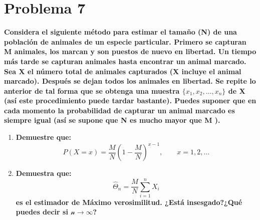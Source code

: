 \section*{Problema 7}

\textbf{Considera el siguiente método para estimar el tamaño (N) de una población de animales de un especie particular. Primero se capturan M animales, los marcan y son puestos de nuevo en libertad. Un tiempo más tarde se capturan animales hasta encontrar un animal marcado. Sea X el número total de animales capturados (X incluye el animal marcado). Después se dejan todos los animales en libertad. Se repite lo anterior de tal forma que se obtenga una muestra $\{x_1,x_2,\dots,x_n\}$ de X (así este procedimiento puede tardar bastante). Puedes suponer que en cada momento la probabilidad de capturar un animal marcado es siempre igual (así se supone que N es mucho mayor que M ).
}

\begin{enumerate}
    \item \textbf{Demuestre que:}
          \begin{equation*}
              P(X=x) = \frac{M}{N} \left (1-\frac{M}{N}\right )^{x-1}, \qquad x=1,2,\dots
          \end{equation*}
    \item \textbf{Demuestra que:}
          \begin{equation*}
              \hat{\Theta}_n = \frac{M}{N} \sum_{i=1}^n X_i
          \end{equation*}
          \textbf{es el estimador de Máximo verosimilitud. ¿Está insesgado?¿Qué puedes decir si $\mathcal{n\rightarrow \infty}$?}
\end{enumerate}